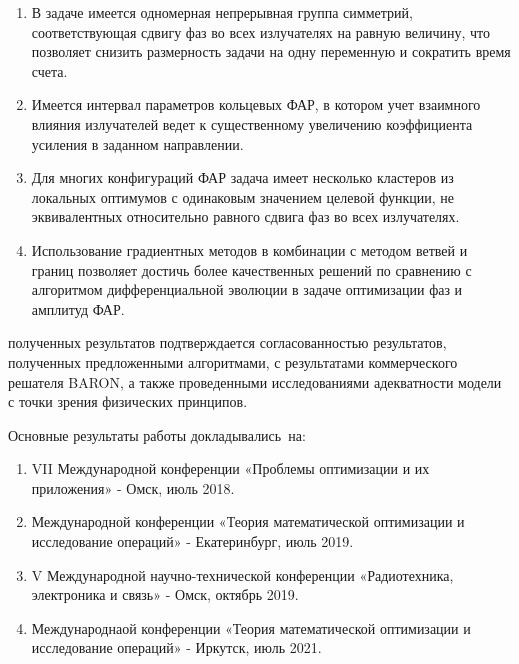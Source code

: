 {}
\begin{enumerate}[beginpenalty=10000] %
  \item В задаче имеется одномерная непрерывная группа симметрий, соответствующая сдвигу фаз во всех излучателях на равную величину, что позволяет снизить размерность задачи на одну переменную и сократить время счета.
  \item Имеется интервал параметров кольцевых ФАР, в котором учет взаимного влияния излучателей ведет к существенному увеличению коэффициента усиления в заданном направлении.
\item Для многих конфигураций ФАР задача имеет несколько кластеров из локальных оптимумов с одинаковым значением целевой функции, не эквивалентных относительно равного сдвига фаз во всех излучателях.
  \item Использование градиентных методов в комбинации с методом ветвей и границ позволяет достичь более качественных решений по сравнению с алгоритмом дифференциальной эволюции в задаче оптимизации фаз и амплитуд ФАР.
\end{enumerate}

{\reliability} полученных результатов подтверждается согласованностью  результатов, полученных предложенными алгоритмами, с результатами коммерческого решателя BARON, а также проведенными исследованиями адекватности модели с точки зрения физических принципов.


{\probation}
Основные результаты работы докладывались~на:
\begin{enumerate}[beginpenalty=10000] %
  \item VII Международной конференции «Проблемы оптимизации и их приложения» - Омск, июль 2018.
  \item Международной конференции «Теория математической оптимизации и исследование операций» - Екатеринбург, июль 2019.
  \item V Международной научно-технической конференции «Радиотехника, электроника и связь» - Омск, октябрь 2019.
  \item Международнаой конференции «Теория математической оптимизации и исследование операций» - Иркутск, июль 2021.
\end{enumerate}

